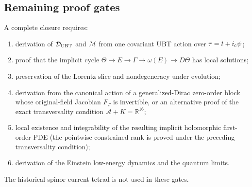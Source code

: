 \subsection{Remaining proof gates}
A complete closure requires:
\begin{enumerate}
 \item derivation of $\mathcal D_{\rm UBT}$ and $\mathcal M$ from one covariant
       UBT action over $\tau=t+i_{\rm c}\psi$;
 \item proof that the implicit cycle
       $\Theta\to E\to\Gamma\to\omega(E)\to D\Theta$ has local solutions;
 \item preservation of the Lorentz slice and nondegeneracy under evolution;
 \item derivation from the canonical action of a generalized-Dirac
       zero-order block whose original-field Jacobian $F_\Psi$ is invertible,
       or an alternative proof of the exact transversality condition
       $\mathcal A+K=\mathbb R^{16}$;
 \item local existence and integrability of the resulting implicit
       holomorphic first-order PDE (the pointwise constrained rank is proved
       under the preceding transversality condition);
 \item derivation of the Einstein low-energy dynamics and the quantum limits.
\end{enumerate}
The historical spinor-current tetrad is not used in these gates.
